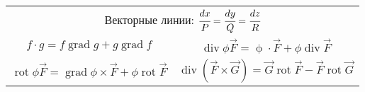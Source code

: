 \begin{tabular}{c|c|c|c}
\multicolumn{4}{c}{Векторные линии: $
	\cfrac{dx}{P} = \cfrac{dy}{Q} = \cfrac{dz}{R}
	$}
\\[0.5cm]

\multicolumn{2}{c}{
$\displaystyle f\cdot g = f\operatorname{grad}g + g\operatorname{grad}f$} &
\multicolumn{2}{c}{$\displaystyle \operatorname{div}\phi \vec{F} = \operatorname{\phi}\cdot \vec{F} + \phi \operatorname{div}\vec{F}$} \\[0.5cm]

\multicolumn{2}{c}{$\displaystyle \operatorname{rot}\phi \vec{F} =
\operatorname{grad}\phi \times \vec{F} + \phi \operatorname{rot} \vec{F}$}
 &
\multicolumn{2}{c}{
$\displaystyle \operatorname{div}(\vec{F}\times\vec{G}) = \vec{G} \operatorname{rot}\vec{F} - \vec{F}\operatorname{rot}\vec{G}$}\\[0.5cm]
\hline
\end{tabular} 